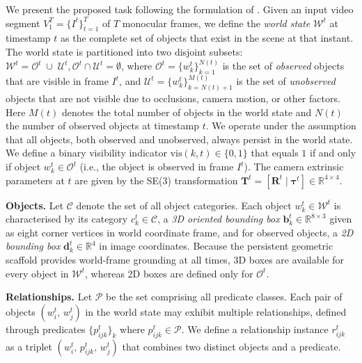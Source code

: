 We present the proposed \WSGG{} task following the formulation of
\cite{peddi2024scenegraphanticipation}. Given an input video segment $V_{1}^{T} =
\{I^{t}\}_{t=1}^{T}$ of $T$ monocular frames, we define the \emph{world state} $\mathcal{W}^{t}$ at
timestamp $t$ as the complete set of objects that exist in the scene at that instant. The world
state is partitioned into two disjoint subsets: $\mathcal{W}^{t} = \mathcal{O}^{t} \;\cup\;
\mathcal{U}^{t}, \mathcal{O}^{t} \cap \mathcal{U}^{t} = \emptyset$, where $\mathcal{O}^{t} =
\{w_{k}^{t}\}_{k=1}^{N(t)}$ is the set of \emph{observed} objects that are visible in frame $I^{t}$,
and $\mathcal{U}^{t} = \{w_{k}^{t}\}_{k=N(t)+1}^{M(t)}$ is the set of \emph{unobserved} objects that
are not visible due to occlusions, camera motion, or other factors. Here $M(t)$ denotes the total
number of objects in the world state and $N(t)$ the number of observed objects at timestamp $t$. We
operate under the assumption that all objects, both observed and unobserved, always persist in the
world state. We define a binary visibility indicator $\text{vis}(k,t) \in \{0,1\}$ that equals $1$
if and only if object $w_{k}^{t} \in \mathcal{O}^{t}$ (i.e., the object is observed in frame
$I^{t}$). The camera extrinsic parameters at $t$ are given by the SE(3) transformation
$\mathbf{T}^{t} = [\mathbf{R}^{t} \mid \boldsymbol{\tau}^{t}] \in \mathbb{R}^{4 \times 4}$.


\vspace{1mm}
\noindent\textbf{Objects.} Let $\mathcal{C}$ denote the set of all object categories.
Each object $w_{k}^{t} \in \mathcal{W}^{t}$ is characterised by its category $c_{k}^{t} \in
\mathcal{C}$, a \emph{3D oriented bounding box} $\mathbf{b}_{k}^{t} \in \mathbb{R}^{8 \times 3}$
given as eight corner vertices in world coordinate frame, and for observed objects, a \emph{2D
bounding box} $\mathbf{d}_{k}^{t} \in \mathbb{R}^{4}$ in image coordinates. Because the persistent
geometric scaffold provides world-frame grounding at all times, 3D boxes are available for every
object in $\mathcal{W}^{t}$, whereas 2D boxes are defined only for $\mathcal{O}^{t}$.

\vspace{1mm}
\noindent\textbf{Relationships.} Let $\mathcal{P}$ be the set comprising all predicate classes.
Each pair of objects $\left(w_{i}^{t},\, w_{j}^{t}\right)$ in the world state may exhibit multiple
relationships, defined through predicates $\{p_{ijk}^{t}\}_{k}$ where $p_{ijk}^{t} \in \mathcal{P}$.
We define a relationship instance $r_{ijk}^{t}$ as a triplet $\left(w_{i}^{t},\, p_{ijk}^{t},\,
w_{j}^{t}\right)$ that combines two distinct objects and a predicate.


